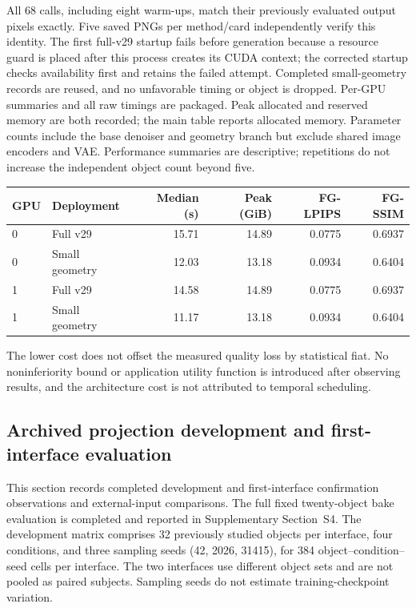 \documentclass[11pt]{article}
\begin{document}
All 68 calls, including eight warm-ups, match their previously evaluated output pixels exactly. Five saved PNGs per method/card independently verify this identity. The first full-v29 startup fails before generation because a resource guard is placed after this process creates its CUDA context; the corrected startup checks availability first and retains the failed attempt. Completed small-geometry records are reused, and no unfavorable timing or object is dropped. Per-GPU summaries and all raw timings are packaged. Peak allocated and reserved memory are both recorded; the main table reports allocated memory. Parameter counts include the base denoiser and geometry branch but exclude shared image encoders and VAE. Performance summaries are descriptive; repetitions do not increase the independent object count beyond five.

\begin{center}\scriptsize

\begin{tabular}{llrrrr}
\toprule
GPU & Deployment & Median (s) & Peak (GiB) & FG-LPIPS & FG-SSIM \\
\midrule
0 & Full v29 & 15.71 & 14.89 & 0.0775 & 0.6937 \\
0 & Small geometry & 12.03 & 13.18 & 0.0934 & 0.6404 \\
1 & Full v29 & 14.58 & 14.89 & 0.0775 & 0.6937 \\
1 & Small geometry & 11.17 & 13.18 & 0.0934 & 0.6404 \\
\bottomrule
\end{tabular}


\end{center}
The lower cost does not offset the measured quality loss by statistical fiat. No noninferiority bound or application utility function is introduced after observing results, and the architecture cost is not attributed to temporal scheduling.

\subsection*{Archived projection development and first-interface evaluation}
This section records completed development and first-interface confirmation
observations and external-input comparisons. The full fixed twenty-object bake evaluation is completed and reported in Supplementary Section~S4. The development matrix comprises 32 previously
studied objects per interface, four conditions, and three sampling seeds
(42, 2026, 31415), for 384 object--condition--seed cells per interface. The two
interfaces use different object sets and are not pooled as paired subjects.
Sampling seeds do not estimate training-checkpoint variation.
\end{document}
